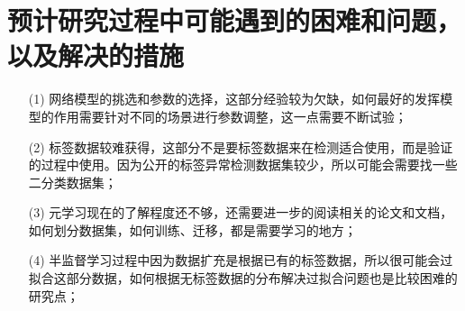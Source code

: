 \section{预计研究过程中可能遇到的困难和问题，以及解决的措施}

\begin{itemize}
    \item[(1)] 网络模型的挑选和参数的选择，这部分经验较为欠缺，如何最好的发挥模型的作用需要针对不同的场景进行参数调整，这一点需要不断试验；
    \item[(2)] 标签数据较难获得，这部分不是要标签数据来在检测适合使用，而是验证的过程中使用。因为公开的标签异常检测数据集较少，所以可能会需要找一些二分类数据集；
    \item[(3)] 元学习现在的了解程度还不够，还需要进一步的阅读相关的论文和文档，如何划分数据集，如何训练、迁移，都是需要学习的地方；
    \item[(4)] 半监督学习过程中因为数据扩充是根据已有的标签数据，所以很可能会过拟合这部分数据，如何根据无标签数据的分布解决过拟合问题也是比较困难的研究点；
\end{itemize}



